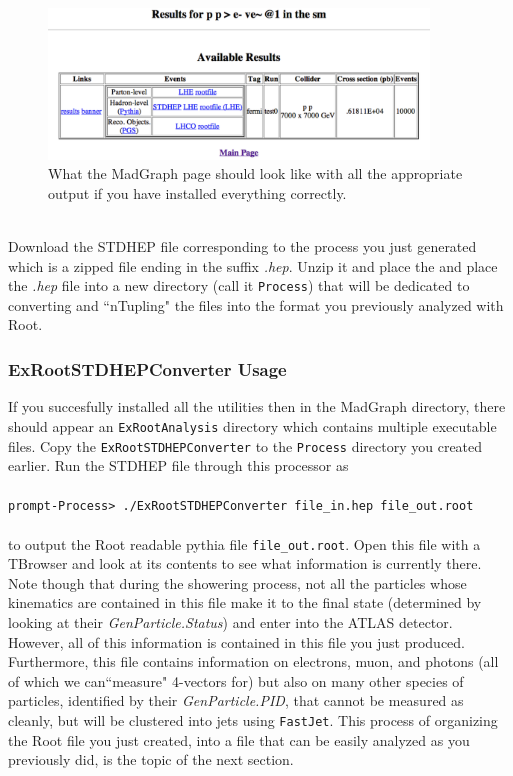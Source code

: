 \documentclass[12pt]{article}
\begin{document}
\\
\begin{figure}[htp]
\centering
\includegraphics[width=0.9\textwidth]{STDHEPexamples.pdf}
\caption{What the MadGraph page should look like with all the appropriate output if you have installed everything correctly.}
  \label{fig:output}
\end{figure}
\\
Download the STDHEP file corresponding to the process you just generated which is a zipped file ending in the suffix \textit{.hep}. Unzip it and place the and place the \textit{.hep} file into a new directory (call it \texttt{Process}) that will be dedicated to converting and ``nTupling" the files into the format you previously analyzed with Root.  

\subsubsection{ExRootSTDHEPConverter Usage}
If you succesfully installed all the utilities then in the MadGraph directory, there should appear an \texttt{ExRootAnalysis} directory which contains multiple executable files.  Copy the \texttt{ExRootSTDHEPConverter} to the \texttt{Process} directory you created earlier.  Run the STDHEP file through this processor as\\
\\
\texttt{prompt-Process> ./ExRootSTDHEPConverter file\_in.hep file\_out.root}\\ 
\\
to output the Root readable pythia file \texttt{file\_out.root}.  Open this file with a TBrowser and look at its contents to see what information is currently there.  Note though that during the showering process, not all the particles whose kinematics are contained in this file make it to the final state (determined by looking at their \textit{GenParticle.Status}) and enter into the ATLAS detector.  However, all of this information is contained in this file you just produced.  Furthermore, this file contains information on electrons, muon, and photons (all of which we can``measure" 4-vectors for) but also on many other species of particles, identified by their \textit{GenParticle.PID}, that cannot be measured as cleanly, but will be clustered into jets using \texttt{FastJet}.  This process of organizing the Root file you just created, into a file that can be easily analyzed as you previously did, is the topic of the next section.
\end{document}
